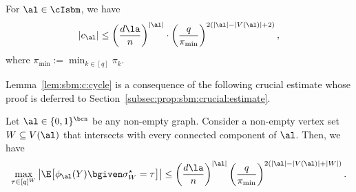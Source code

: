 \documentclass[11pt]{article}
\begin{document}
\begin{lemma}\label{lem:sbm:c:cycle}
For $\al \in \cIsbm$, we have
\[
|c_{\al}|\leq \left(\frac{d\la}{n}\right)^{|\al|} \cdot \left(\frac{q}{\pi_{\min}}\right)^{2(|\al|-|V(\al)|+2)},
\]
where $\pi_{\min} := \min_{k\in [q]}\pi_k$.
\end{lemma}

\noindent Lemma~\ref{lem:sbm:c:cycle} is a consequence of the following crucial estimate whose proof is deferred to Section~\ref{subsec:prop:sbm:crucial:estimate}.
\begin{proposition}\label{prop:sbm:crucial:estimate}
Let $\al\in \{0,1\}^{\bcn}$ be any non-empty graph. Consider a non-empty vertex set $W\subseteq V(\al)$ that intersects with every connected component of $\al$. Then, we have
\begin{equation}\label{eq:prop:sbm:crucial:estimate}
\max_{\tau\in [q]^W}\left|\E\big[\phi_{\al}(Y)\bgiven \sigma^\star_W=\tau\big]\right|\leq \left(\frac{d\la}{n}\right)^{|\al|}\left(\frac{q}{\pi_{\min}}\right)^{2(|\al|-|V(\al)|+|W|)}.
\end{equation}
\end{proposition}
\end{document}
